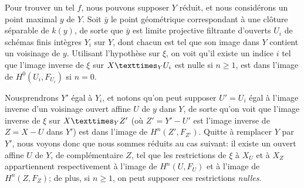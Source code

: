 \documentclass[10pt]{../fichiers-configuration-latex/smfart}
\begin{document}
Pour trouver un tel $f$, nous pouvons supposer $Y$ réduit, et nous
considérons un point maximal $y$ de $Y$. Soit $\bar{y}$ le point
géométrique correspondant à une clôture séparable de $k(y)$, de sorte
que $\bar{y}$ est limite projective filtrante d'ouverts $U_i$ de
schémas finis intègres $Y_i$ sur $Y$, dont chacun est tel que son
image dans $Y$ contient un voisinage de $y$. Utilisant l'hypothèse sur
$\xi$, on voit qu'il existe un indice $i$ tel que l'image inverse de
$\xi$ sur $\fprod{X}{U_i}{Y}$ est nulle si $n\geq 1$, \resp est dans
l'image de $H^{0}(U_i,F_{U_i})$ si $n=0$.

Nous\pageoriginale prendrons $Y'$ égal à $Y_i$, et notons qu'on peut
supposer $U'=U_i$ égal à l'image inverse d'un voisinage ouvert affine
$U$ de $y$ dans $Y$, de sorte qu'on voit que l'image inverse de $\xi$
sur $\fprod{X}{Z'}{Y}$ (où $Z'=Y'-U'$ est l'image inverse de $Z=X-U$
dans $Y'$) est dans l'image de $H^{n}(Z',F_{Z'})$. Quitte à remplacer
$Y$ par $Y'$, nous voyons donc que nous sommes réduits au cas suivant:
il existe un ouvert affine $U$ de $Y$, de complémentaire $Z$, tel que
les restrictions de $\xi$ à $X_U$ et à $X_Z$ appartiennent
respectivement à l'image de $H^{n}(U,F_U)$ et à l'image de
$H^{n}(Z,F_Z)$; de plus, si $n\geq 1$, on peut supposer ces
restrictions \emph{nulles}.
\end{document}
